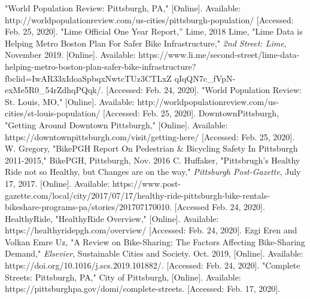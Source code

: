 \documentclass[letterpaper, 12 pt, conference]{ieeeconf}  %
\begin{document}
\addtolength{\textheight}{-14cm}   %



\begin{thebibliography}{99}

 "World Population Review: Pittsburgh, PA," [Online]. Available: http://worldpopulationreview.com/us-cities/pittsburgh-population/ [Accessed: Feb. 25, 2020].
 "Lime Official One Year Report,” Lime, 2018
 Lime, "Lime Data is Helping Metro Boston Plan For Safer Bike Infrastructure," \textit{2nd Street: Lime}, November 2019. [Online]. Available: https://www.li.me/second-street/lime-data-helping-metro-boston-plan-safer-bike-infrastructure?fbclid=IwAR33xIdoaSpbqxNwtcTUz3CTLxZ
\newline qIqQN7c\_fVpN-exMe5R0\_54rZdhqPQqk/. [Accessed: Feb. 24, 2020].
 "World Population Review: St. Louis, MO," [Online]. Available: http://worldpopulationreview.com/us-cities/st-louis-population/ [Accessed: Feb. 25, 2020].
 DowntownPittsburgh, "Getting Around Downtown Pittsburgh," [Online]. Available: https://downtownpittsburgh.com/visit/getting-here/ [Accessed: Feb. 25, 2020].
 W. Gregory, "BikePGH Report On Pedestrian \& Bicycling Safety In Pittsburgh 2011-2015," BikePGH, Pittsburgh, Nov. 2016
 C. Huffaker, "Pittsbrugh's Healthy Ride not so Healthy, but Changes are on the way," \textit{Pittsburgh Post-Gazette}, July 17, 2017. [Online]. Available: https://www.post-gazette.com/local/city/2017/07/17/healthy-ride-pittsburgh-bike-rentals-bikeshare-programs-pa/stories/201707170010. [Accessed Feb. 24, 2020].
 HealthyRide, "HealthyRide Overview," [Online]. Available: https://healthyridepgh.com/overview/ [Accessed: Feb. 24, 2020]. 
 Ezgi Eren and Volkan Emre Uz, "A Review on Bike-Sharing: The Factors Affecting Bike-Sharing Demand," \textit{Elsevier}, Sustainable Cities and Society. Oct. 2019, [Online]. Available: https://doi.org/10.1016/j.scs.2019.101882/. [Accessed: Feb. 24, 2020].
 "Complete Streets: Pittsburgh, PA," City of Pittsburgh, [Online]. Available: https://pittsburghpa.gov/domi/complete-streets. [Accessed: Feb. 17, 2020].

\end{thebibliography}
\end{document}
